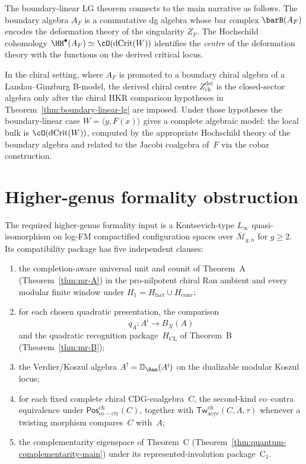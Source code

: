 \begin{remark}
\label{rem:lg-bar-connection}
The boundary-linear LG theorem connects to the main narrative
as follows. The boundary algebra $A_F$ is a commutative dg
algebra whose bar complex $\barB(A_F)$ encodes the deformation
theory of the singularity $Z_F$. The Hochschild cohomology
$\HH^\bullet(A_F) \simeq \cO(\operatorname{dCrit}(W))$
identifies the \emph{centre} of the deformation theory with
the functions on the derived critical locus.

In the chiral setting, where $A_F$ is promoted to a boundary
chiral algebra of a Landau--Ginzburg B-model, the derived chiral
centre $Z^{\mathrm{der}}_{\mathrm{ch}}$ is the closed-sector algebra
only after the chiral HKR comparison hypotheses in
Theorem~\ref{thm:boundary-linear-lg} are imposed. Under those
hypotheses the boundary-linear case
$W=\langle y,F(x)\rangle$ gives a complete algebraic model:
the local bulk is $\cO(\operatorname{dCrit}(W))$, computed by the
appropriate Hochschild theory of the boundary algebra and related to
the Jacobi coalgebra of~$F$ via the cobar construction.
\end{remark}


\section{Higher-genus formality obstruction}\label{sec:open-questions}

The required higher-genus formality input is a Kontsevich-type
\(L_\infty\) quasi-isomorphism on log-FM compactified configuration
spaces over \(\overline{\mathcal M}_{g,n}\) for \(g\geq2\).  Its
compatibility package has five independent clauses:
\begin{enumerate}[label=\textup{(\roman*)}]
\item the completion-aware universal unit and counit of Theorem~A
 \textup{(}Theorem~\ref{thm:mr-A}\textup{)} in the pro-nilpotent
 chiral Ran ambient and every modular finite window under
 \(H_1=H_{\mathrm{fact}}\cup H_{\mathrm{conv}}\);
\item for each chosen quadratic presentation, the comparison
 \[
 q_A\colon A^{\mathrm i}\longrightarrow B_X(A)
 \]
 and the quadratic recognition package~\(H_{\mathrm{CL}}\) of
 Theorem~B \textup{(}Theorem~\ref{thm:mr-B}\textup{)};
\item the Verdier/Koszul algebra
 \(A^!=\mathbb D_{\Ran}(A^{\mathrm i})\) on the dualizable modular
 Koszul locus;
\item for each fixed complete chiral CDG-coalgebra~\(C\), the
 second-kind co--contra equivalence under
 \(\mathsf{Pos}^{\mathrm{ch}}_{\mathrm{co-ctr}}(C)\), together with
 \(\mathsf{Tw}^{\mathrm{ch}}_{\mathrm{acyc}}(C,A,\tau)\) whenever a
 twisting morphism compares~\(C\) with~\(A\);
\item the complementarity eigenspace of Theorem~C
 \textup{(}Theorem~\ref{thm:quantum-complementarity-main}\textup{)}
 under its represented-involution package~\(\mathrm C_1\).
\end{enumerate}

